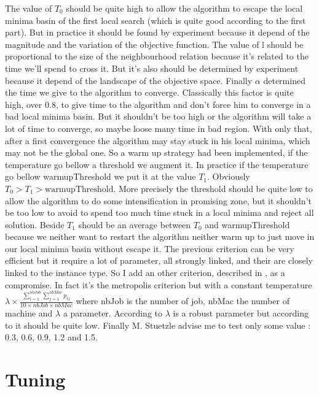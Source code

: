 \documentclass[12pt,a4paper]{article}
\begin{document}
The value of $T_0$ should be quite high to allow the algorithm to escape the local minima basin of the first local search (which is quite good according to the first part). But in practice it should be found by experiment because it depend of the magnitude and the variation of the objective function. The value of l should be proportional to the size of the neighbourhood relation because it's related to the time we'll spend to cross it. But it's also should be determined by experiment because it depend of the landscape of the objective space. Finally $\alpha$ determined the time we give to the algorithm to converge. Classically this factor is quite high, over $0.8$, to give time to the algorithm and don't force him to converge in a bad local minima basin. But it shouldn't be too high or the algorithm will take a lot of time to converge, so maybe loose many time in bad region. With only that, after a first convergence the algorithm may stay stuck in his local minima, which may not be the global one. So a warm up strategy had been implemented, if the temperature go bellow a threshold we augment it. In practice if the temperature go bellow warmupThreshold we put it at the value $T_1$. Obviously $T_0 > T_1 > \text{warmupThreshold}$. More precisely the threshold should be quite low to allow the algorithm to do some intensification in promising zone, but it shouldn't be too low to avoid to spend too much time stuck in a local minima and reject all solution. Beside $T_1$ should be an average between $T_0$ and warmupThreshold because we neither want to restart the algorithm neither warm up to just move in our local minima basin without escape it. The previous criterion can be very efficient but it require a lot of parameter, all strongly linked, and their are closely linked to the instance type. So I add an other criterion, described in \cite{Ruiz06asimple}, as a compromise. In fact it's the metropolis criterion but with a constant temperature $\lambda \times \frac{\sum \limits_{i = 1}^{nbJob} \sum \limits_{j=1}^{nbMac} p_{ij} }{10 \times nbJob \times nbMac}$ where nbJob is the number of job, nbMac the number of machine and $\lambda$ a parameter. According to \cite{Pan201231} $\lambda$ is a robust parameter but according to \cite{Ruiz06asimple} it should be quite low. Finally M. Stuetzle advise me to test only some value : 0.3, 0.6, 0.9, 1.2 and 1.5.
 
\section{Tuning}
\end{document}

